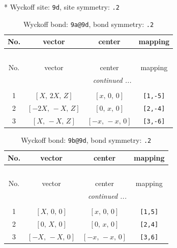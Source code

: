 \documentclass[fleqn,8pt]{jsarticle}
\begin{document}
* Wyckoff site: {\tt 9d}, site symmetry: {\tt .2}
\renewcommand{\arraystretch}{1.2}
\begin{longtable}{cccc}
\caption{Wyckoff bond: {\tt 9a@9d}, bond symmetry: {\tt .2}}
 \\
 \hline \hline
No. & vector & center & mapping \\ \hline \endfirsthead

\multicolumn{3}{l}{\tablename\ \thetable{}} \\
 \hline \hline
No. & vector & center & mapping \\ \hline \endhead

 \hline \hline
\multicolumn{3}{r}{\footnotesize\it continued ...} \\ \endfoot

 \hline \hline
\multicolumn{3}{r}{} \\ \endlastfoot

1 & $\left[ X,\, 2 X,\, Z \right]$ & $\left[ x,\, 0,\, 0 \right]$ & {\tt [1,-5]} \\ \hline
2 & $\left[ - 2 X,\, - X,\, Z \right]$ & $\left[ 0,\, x,\, 0 \right]$ & {\tt [2,-4]} \\ \hline
3 & $\left[ X,\, - X,\, Z \right]$ & $\left[ - x,\, - x,\, 0 \right]$ & {\tt [3,-6]} \\
\end{longtable}
\renewcommand{\arraystretch}{1.2}
\begin{longtable}{cccc}
\caption{Wyckoff bond: {\tt 9b@9d}, bond symmetry: {\tt .2}}
 \\
 \hline \hline
No. & vector & center & mapping \\ \hline \endfirsthead

\multicolumn{3}{l}{\tablename\ \thetable{}} \\
 \hline \hline
No. & vector & center & mapping \\ \hline \endhead

 \hline \hline
\multicolumn{3}{r}{\footnotesize\it continued ...} \\ \endfoot

 \hline \hline
\multicolumn{3}{r}{} \\ \endlastfoot

1 & $\left[ X,\, 0,\, 0 \right]$ & $\left[ x,\, 0,\, 0 \right]$ & {\tt [1,5]} \\ \hline
2 & $\left[ 0,\, X,\, 0 \right]$ & $\left[ 0,\, x,\, 0 \right]$ & {\tt [2,4]} \\ \hline
3 & $\left[ - X,\, - X,\, 0 \right]$ & $\left[ - x,\, - x,\, 0 \right]$ & {\tt [3,6]} \\
\end{longtable}
\end{document}
